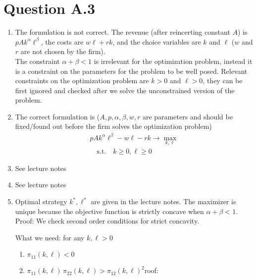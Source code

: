 \documentclass[letterpaper,10pt,english]{jupyterBook}
\begin{document}
\section{Question A.3}
\label{\detokenize{02.exercises_solutions:question-a-3}}\begin{enumerate}
%
\item {} 
\sphinxAtStartPar
The formulation is not correct. The revenue (after reincerting constant \(A\)) is \(p A k^{\alpha} \ell^{\beta}\), the costs are \(w \ell + r k\), and the choice variables are \(k\) and \(\ell\) (\(w\) and \(r\) are not chosen by the firm).\\
The constraint \(\alpha + \beta < 1\) is irrelevant for the optimization problem, instead it is a constraint on the parameters for the problem to be well posed.
Relevant constraints on the optimization problem are \(k>0\) and \(\ell>0\), they can be first ignored and checked after we solve the unconstrained version of the problem.

\item {} 
\sphinxAtStartPar
The correct formulation is (\(A, p, \alpha, \beta, w, r\) are parameters and should be fixed/found out before the firm solves the optimization problem)
\begin{equation*}
\begin{split}
   p A k^{\alpha} \ell^{\beta} - w \ell - r k
   \rightarrow \max_{k, \ell}\\
   \quad \mathrm{s.t.} \quad
   k \ge 0, \ell \ge 0
   \end{split}
\end{equation*}
\item {} 
\sphinxAtStartPar
See lecture notes

\item {} 
\sphinxAtStartPar
See lecture notes

\item {} 
\sphinxAtStartPar
Optimal strategy \(k^*, \ell^*\) are given in the lecture notes. The maximizer is unique because the objective function is strictly concave when \(\alpha+\beta < 1\).
Proof:
We check second order conditions for strict concavity.

\sphinxAtStartPar
What we need: for any \(k, \ell > 0\)
\begin{enumerate}
%
\item {} 
\sphinxAtStartPar
\(\pi_{11}(k, \ell) < 0\)

\item {} 
\sphinxAtStartPar
\(\pi_{11}(k, \ell) \, \pi_{22}(k, \ell) >  \pi_{12}(k, \ell)^2\)roof: 


\end{enumerate}
\end{enumerate}
\end{document}
